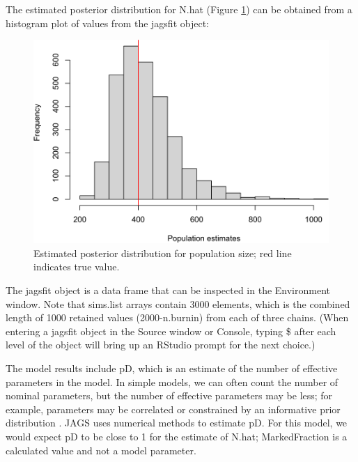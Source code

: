 \documentclass[
]{krantz}
\makeatletter
\newenvironment{Shaded}{\begin{snugshade}}{\end{snugshade}}
\newcommand{\AttributeTok}[1]{\textcolor[rgb]{0.27,0.27,0.27}{#1}}
\newcommand{\FunctionTok}[1]{\textcolor[rgb]{0.27,0.27,0.27}{\textbf{#1}}}
\newcommand{\NormalTok}[1]{#1}
\newcommand{\SpecialCharTok}[1]{\textcolor[rgb]{0.43,0.43,0.43}{\textbf{#1}}}
\newcommand{\StringTok}[1]{\textcolor[rgb]{0.5,0.5,0.5}{#1}}
\newenvironment{kframe}{%
\medskip{}
\setlength{\fboxsep}{.8em}
 \def\at@end@of@kframe{}%
 \ifinner\ifhmode%
  \def\at@end@of@kframe{\end{minipage}}%
  \begin{minipage}{\columnwidth}%
 \fi\fi%
 \def\FrameCommand##1{\hskip\@totalleftmargin \hskip-\fboxsep
 \colorbox{shadecolor}{##1}\hskip-\fboxsep
     \hskip-\linewidth \hskip-\@totalleftmargin \hskip\columnwidth}%
 \MakeFramed {\advance\hsize-\width
   \@totalleftmargin\z@ \linewidth\hsize
   \@setminipage}}%
 {\par\unskip\endMakeFramed%
 \at@end@of@kframe}
\renewenvironment{Shaded}{\begin{kframe}}{\end{kframe}}
\makeatother
\begin{document}
The estimated posterior distribution for N.hat (Figure \ref{fig:BayesMR}) can be obtained from a histogram plot of values from the jagsfit object:

\begin{Shaded}
\end{Shaded}

\begin{figure}
\includegraphics[width=0.9\linewidth]{bookdown_files/figure-latex/BayesMR-1} \caption{Estimated posterior distribution for population size; red line indicates true value.}\label{fig:BayesMR}
\end{figure}

The jagsfit object is a data frame that can be inspected in the Environment window. Note that sims.list arrays contain 3000 elements, which is the combined length of 1000 retained values (2000-n.burnin) from each of three chains. (When entering a jagsfit object in the Source window or Console, typing \$ after each level of the object will bring up an RStudio prompt for the next choice.)

The model results include pD, which is an estimate of the number of effective parameters in the model. In simple models, we can often count the number of nominal parameters, but the number of effective parameters may be less; for example, parameters may be correlated or constrained by an informative prior distribution \citep{mccarthy2007}. JAGS uses numerical methods to estimate pD. For this model, we would expect pD to be close to 1 for the estimate of N.hat; MarkedFraction is a calculated value and not a model parameter.
\end{document}
